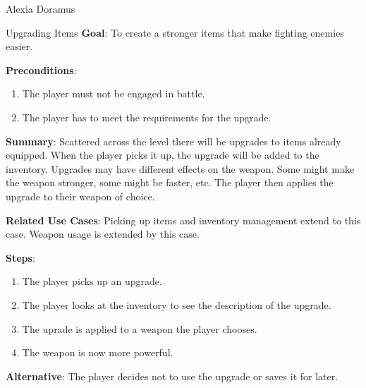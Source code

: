 \documentclass[12pt]{report}
\begin{document}
\begin{section}{Alexia Doramus}
\begin{subsection}{Upgrading Items}
\textbf{Goal}:
To create a stronger items that make fighting enemies easier.

\textbf{Preconditions}:
\begin{enumerate}
\item The player must not be engaged in battle.
\item The player has to meet the requirements for the upgrade.
\end{enumerate}

\textbf{Summary}:
Scattered across the level there will be upgrades to items already equipped. When the player picks it up, the upgrade will be added to the inventory. Upgrades may have different effects on the weapon. Some might make the weapon stronger, some might be faster, etc. The player then applies the upgrade to their weapon of choice.

\textbf{Related Use Cases}:
Picking up items and inventory management extend to this case. Weapon usage is extended by this case.

\textbf{Steps}:
\begin{enumerate}
\item The player picks up an upgrade.
\item The player looks at the inventory to see the description of the upgrade.
\item The uprade is applied to a weapon the player chooses.
\item The weapon is now more powerful.
\end{enumerate}

\textbf{Alternative}:
The player decides not to use the upgrade or saves it for later.
\end{subsection}
\end{section}
\end{document}
